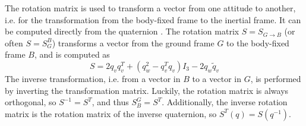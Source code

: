 

The rotation matrix is used to transform a vector from one attitude to another, i.e. for the transformation from the body-fixed frame to the inertial frame.
It can be computed directly from the quaternion \cite{zipfel2007, stevens2015}. 
The rotation matrix $S = S_{G \to B}$ (or often $S = S^B_G$) transforms a vector from the ground frame $G$ to the body-fixed frame $B$, and is computed as
\begin{equation}
    S = 2 q_v q_v^T + (q_w^2-q_v^T q_v) I_3 - 2 q_w \tilde q_v \label{eq:rotationmatrix}
\end{equation}
The inverse transformation, i.e. from a vector in $B$ to a vector in $G$, is performed by inverting the transformation matrix. 
Luckily, the rotation matrix is always orthogonal, so $S^{-1} = S^T$, and thus $S^G_B = S^T$. 
Additionally, the inverse rotation matrix is the rotation matrix of the inverse quaternion, so $S^T(q) = S(q^{-1})$.

